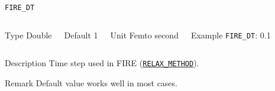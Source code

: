 \documentclass[xcolor=dvipsnames,t]{beamer}
\begin{document}
\begin{frame}[allowframebreaks]{\texttt{FIRE\_DT}} \label{FIRE_DT}
\vspace*{-12pt}
\begin{columns}
\begin{block}{Type}
Double
\end{block}

\begin{block}{Default}
1
\end{block}

\begin{block}{Unit}
Femto second
\end{block}

\begin{block}{Example}
\texttt{FIRE\_DT}: 0.1
\end{block}
\end{columns}

\begin{block}{Description}
Time step used in FIRE (\hyperlink{RELAX_METHOD}{\texttt{RELAX\_METHOD}}).
\end{block}

\begin{block}{Remark}
Default value works well in most cases.
\end{block}

\end{frame}
\end{document}
